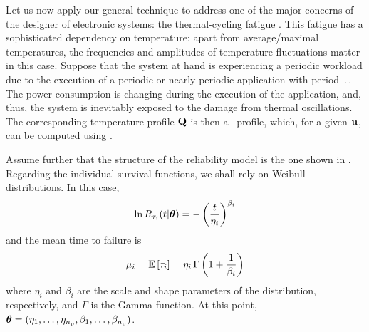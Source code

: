 Let us now apply our general technique to address one of the major concerns of the designer of electronic systems: the thermal-cycling fatigue \cite{jedec}.
This fatigue has a sophisticated dependency on temperature: apart from average/maximal temperatures, the frequencies and amplitudes of temperature fluctuations matter in this case.
Suppose that the system at hand is experiencing a periodic workload due to the execution of a periodic or nearly periodic application with period $\period$.
The power consumption is changing during the execution of the application, and, thus, the system is inevitably exposed to the damage from thermal oscillations.
The corresponding temperature profile $\mathbf{Q}$ is then a \DSS\ profile, which, for a given $\mathbf{u}$, can be computed using .

Assume further that the structure of the reliability model is the one shown in .
Regarding the individual survival functions, we shall rely on Weibull distributions.
In this case,
\begin{equation} \elab{weibull-model}
  \ln \survival_{\T_i}(\t | \pvw) = -\left( \frac{\t}{\eta_i} \right)^{\beta_i}
\end{equation}
and the mean time to failure is
\begin{equation} \elab{weibull-expectation}
  \mu_i = \expectation{\T_i} = \eta_i \, \Gamma\left(1 + \frac{1}{\beta_i}\right)
\end{equation}
where $\eta_i$ and $\beta_i$ are the scale and shape parameters of the distribution, respectively, and $\Gamma$ is the Gamma function.
At this point, $\bm{\theta} = (\eta_1, \dotsc, \eta_{n_\text{p}}, \beta_1, \dotsc, \beta_{n_\text{p}})$.

